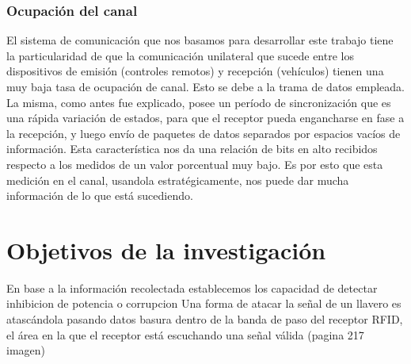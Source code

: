 \documentclass[12pt]{report}
\begin{document}
\subsubsection{Ocupación del canal}

El sistema de comunicación que nos basamos para desarrollar este trabajo tiene la particularidad de que la comunicación unilateral que sucede
entre los dispositivos de emisión (controles remotos) y recepción (vehículos) tienen una muy baja tasa de ocupación de canal. Esto se debe a 
la trama de datos empleada. La misma, como antes fue explicado, posee un período de sincronización que es una rápida variación de estados, para
que el receptor pueda engancharse en fase a la recepción, y luego envío de paquetes de datos separados por espacios vacíos de información. Esta
característica nos da una relación de bits en alto recibidos respecto a los medidos de un valor porcentual muy bajo. Es por esto que esta medición
en el canal, usandola estratégicamente, nos puede dar mucha información de lo que está sucediendo.


\section{Objetivos de la investigación}
En base a la información recolectada establecemos los
capacidad de detectar inhibicion de potencia o corrupcion
Una forma de atacar la señal de un llavero es atascándola pasando datos basura dentro de la banda de paso del receptor RFID, 
el área en la que el receptor está escuchando una señal válida (pagina 217 imagen)




\pagebreak
\end{document}
